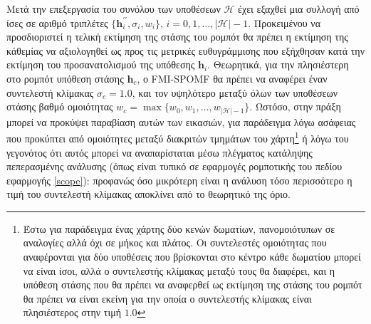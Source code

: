 Μετά την επεξεργασία του συνόλου των υποθέσεων $\mathcal{H}$ έχει εξαχθεί μια
συλλογή από ίσες σε αριθμό τριπλέτες $\{\bm{h}_i^{\prime\prime}, \sigma_i,
w_i\}$, $i = 0,1,\dots,|\mathcal{H}|-1$. Προκειμένου να προσδιοριστεί η τελική
εκτίμηση της στάσης του ρομπότ θα πρέπει η εκτίμηση της κάθεμίας να αξιολογηθεί
ως προς τις μετρικές ευθυγράμμισης που εξήχθησαν κατά την εκτίμηση του
προσανατολισμού της υπόθεσης $\bm{h}_i$.  Θεωρητικά, για την πλησιέστερη στο
ρομπότ υπόθεση στάσης $\bm{h}_c$, ο FMI-SPOMF θα πρέπει να αναφέρει έναν
συντελεστή κλίμακας $\sigma_c = 1.0$, και τον υψηλότερο μεταξύ όλων των
υποθέσεων στάσης βαθμό ομοιότητας $w_c = \max\{w_0, w_1, \dots,
w_{|\mathcal{H}|-1}\}$. Ωστόσο, στην πράξη μπορεί να προκύψει παραβίαση αυτών
των εικασιών, για παράδειγμα λόγω ασάφειας που προκύπτει από ομοιότητες μεταξύ
διακριτών τμημάτων του χάρτη\footnote{Έστω για παράδειγμα ένας χάρτης δύο κενών
δωματίων, πανομοιότυπων σε αναλογίες αλλά όχι σε μήκος και πλάτος. Oι
συντελεστές ομοιότητας που αναφέρονται για δύο υποθέσεις που βρίσκονται στο
κέντρο κάθε δωματίου μπορεί να είναι ίσοι, αλλά ο συντελεστής κλίμακας μεταξύ
τους θα διαφέρει, και η υπόθεση στάσης που θα πρέπει να αναφερθεί ως εκτίμηση
της στάσης του ρομπότ θα πρέπει να είναι εκείνη για την οποία ο συντελεστής
κλίμακας είναι πλησιέστερος στην τιμή $1.0$} ή λόγω του γεγονότος ότι αυτός
μπορεί να αναπαρίσταται μέσω πλέγματος κατάληψης πεπερασμένης ανάλυσης (όπως
είναι τυπικό σε εφαρμογές ρομποτικής του πεδίου εφαρμογής \ref{scope}):
προφανώς όσο μικρότερη είναι η ανάλυση τόσο περισσότερο η τιμή του συντελεστή
κλίμακας αποκλίνει από το θεωρητικό της όριο.

